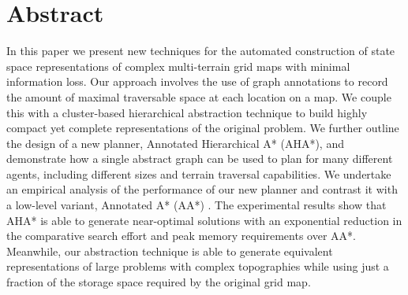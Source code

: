\section{Abstract}
In this paper we present new techniques for the automated construction of state space representations of complex multi-terrain grid maps with minimal information loss. Our approach involves the use of graph annotations to record the amount of maximal traversable space at each location on a map. We couple this with a cluster-based hierarchical abstraction technique to build highly compact yet complete representations of the original problem. We further outline the design of a new planner, Annotated Hierarchical A* (AHA*), and demonstrate how a single abstract graph can be used to plan for many different agents, including different sizes and terrain traversal capabilities.
We undertake an empirical analysis of the performance of our new planner and contrast it with a low-level variant, Annotated A* (AA*) . The experimental results show that AHA* is able to generate near-optimal solutions with an exponential reduction in the comparative search effort and peak memory requirements over AA*. Meanwhile, our abstraction technique is able to generate equivalent representations of large problems with complex topographies while using just a fraction of the storage space required by the original grid map.
